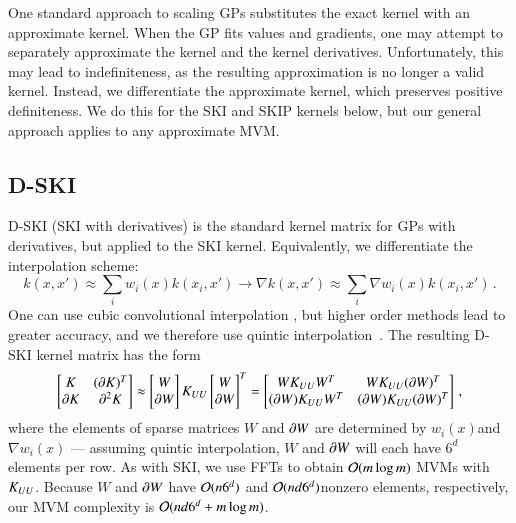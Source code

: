 One standard approach to scaling GPs substitutes the exact kernel with an
approximate kernel. When the GP fits values and gradients, one may attempt to
separately approximate the kernel and the kernel derivatives. Unfortunately,
this may lead to indefiniteness, as the resulting approximation is no longer a
valid kernel. Instead, we differentiate the approximate kernel, which preserves
positive definiteness. We do this for the SKI and SKIP kernels below, but our
general approach applies to any approximate MVM.

\subsection{D-SKI}

D-SKI (SKI with derivatives) is the standard kernel matrix for GPs with
derivatives, but applied to the SKI kernel.  Equivalently, we differentiate the
interpolation scheme:
\begin{equation}\label{eqn:weightderiv}
  k(x,x') \approx \sum_i w_i(x)k(x_i,x')\rightarrow \nabla k(x,x') \approx
  \sum_i \nabla w_i(x) k(x_i,x')\,.
\end{equation}
One can use cubic convolutional interpolation \citep{keys1981cubic}, but higher
order methods lead to greater accuracy, and we therefore use quintic
interpolation~\cite{meijering1999image}.  The resulting D-SKI kernel matrix has
the form
\begin{equation}\label{eqn:dski}
  \begin{bmatrix} K & (\dx K)^T \\ \dx K & \ddx K \end{bmatrix}  \approx
  \begin{bmatrix} W \\ \dx W  \end{bmatrix}  K_{UU}
  \begin{bmatrix} W \\ \dx W  \end{bmatrix} ^T =
  \begin{bmatrix} W\K{UU}W^T & W\K{UU} (\dx W)^T \\
  (\dx W) \K{UU} W^T & (\dx W) \K{UU} (\dx W)^T  \end{bmatrix}\,,
\end{equation}
where the elements of sparse matrices $W$ and  $\operatorname{\partial\!} W$ are determined by $w_i
(x)$and $\nabla w_i(x)$ --- assuming quintic interpolation, $W$ and $\operatorname{\partial\!} W$ will
each have $6^d$ elements per row. As with SKI, we use FFTs to obtain $
\mathcal{O}(m \log m)$ MVMs with $K_{UU}$. Because $W$ and $\operatorname{\partial\!} W$ have $\mathcal{O}(n6^d)$
and $\mathcal{O}(nd6^d)$nonzero elements, respectively, our MVM complexity is $\mathcal{O}
(nd6^d + m \log m)$.

